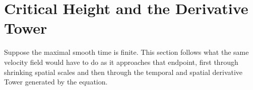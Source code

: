 
\clearpage
\section{Critical Height and the Derivative Tower}\label{sec:CriticalHeightAndDerivativeTower}

Suppose the maximal smooth time is finite.
This section follows what the same velocity field would have to do as it approaches that endpoint, first through shrinking spatial scales and then through the temporal and spatial derivative Tower generated by the equation.




